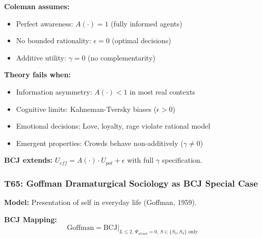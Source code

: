 \begin{tcolorbox}[colback=red!5!white, colframe=red!75!black,
    title=Boundary Condition: Where Coleman Fails]
\textbf{Coleman assumes:}
\begin{itemize}[nosep]
\item Perfect awareness: $A(\cdot) = 1$ (fully informed agents)
\item No bounded rationality: $\epsilon = 0$ (optimal decisions)
\item Additive utility: $\gamma = 0$ (no complementarity)
\end{itemize}

\textbf{Theory fails when:}
\begin{itemize}[nosep]
\item Information asymmetry: $A(\cdot) < 1$ in most real contexts
\item Cognitive limits: Kahneman-Tversky biases ($\epsilon > 0$)
\item Emotional decisions: Love, loyalty, rage violate rational model
\item Emergent properties: Crowds behave non-additively ($\gamma \neq 0$)
\end{itemize}

\textbf{BCJ extends:} $U_{eff} = A(\cdot) \cdot U_{pot} + \epsilon$ with full $\gamma$ specification.
\end{tcolorbox}

\subsubsection*{T65: Goffman Dramaturgical Sociology as BCJ Special Case}

\textbf{Model:} Presentation of self in everyday life (Goffman, 1959).

\textbf{BCJ Mapping:}
\begin{equation}
\text{Goffman} = \text{BCJ} \big|_{L \leq 2, \, \Psi_{struct} = 0, \, S \in \{S_3, S_4\} \text{ only}}
\end{equation}

